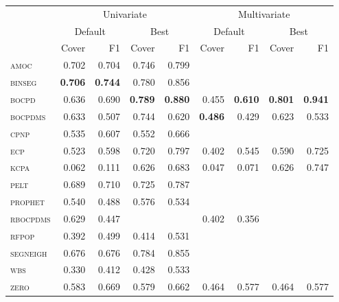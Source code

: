 \begin{tabular}{lrr|rrrr|rr}
 & \multicolumn{4}{c}{Univariate} & \multicolumn{4}{c}{Multivariate} \\\cmidrule(lr){2-5}\cmidrule(lr){6-9}
 & \multicolumn{2}{c}{Default} & \multicolumn{2}{c}{Best} & \multicolumn{2}{c}{Default} & \multicolumn{2}{c}{Best} \\\cmidrule(lr){2-3}\cmidrule(lr){4-5}\cmidrule(lr){6-7}\cmidrule(lr){8-9}
 & Cover & F1 & Cover & F1 & Cover & F1 & Cover & F1\\\cmidrule(r){1-1}\cmidrule(lr){2-5}\cmidrule(l){6-9}
\textsc{amoc}     & 0.702 & 0.704 & 0.746 & 0.799 &       &       &       &       \\
\textsc{binseg}   & \textbf{0.706} & \textbf{0.744} & 0.780 & 0.856 &       &       &       &       \\
\textsc{bocpd}    & 0.636 & 0.690 & \textbf{0.789} & \textbf{0.880} & 0.455 & \textbf{0.610} & \textbf{0.801} & \textbf{0.941} \\
\textsc{bocpdms}  & 0.633 & 0.507 & 0.744 & 0.620 & \textbf{0.486} & 0.429 & 0.623 & 0.533 \\
\textsc{cpnp}     & 0.535 & 0.607 & 0.552 & 0.666 &       &       &       &       \\
\textsc{ecp}      & 0.523 & 0.598 & 0.720 & 0.797 & 0.402 & 0.545 & 0.590 & 0.725 \\
\textsc{kcpa}     & 0.062 & 0.111 & 0.626 & 0.683 & 0.047 & 0.071 & 0.626 & 0.747 \\
\textsc{pelt}     & 0.689 & 0.710 & 0.725 & 0.787 &       &       &       &       \\
\textsc{prophet}  & 0.540 & 0.488 & 0.576 & 0.534 &       &       &       &       \\
\textsc{rbocpdms} & 0.629 & 0.447 &       &       & 0.402 & 0.356 &       &       \\
\textsc{rfpop}    & 0.392 & 0.499 & 0.414 & 0.531 &       &       &       &       \\
\textsc{segneigh} & 0.676 & 0.676 & 0.784 & 0.855 &       &       &       &       \\
\textsc{wbs}      & 0.330 & 0.412 & 0.428 & 0.533 &       &       &       &       \\
\textsc{zero}     & 0.583 & 0.669 & 0.579 & 0.662 & 0.464 & 0.577 & 0.464 & 0.577 \\
\cmidrule(r){1-1}\cmidrule(lr){2-5}\cmidrule(l){6-9}
\end{tabular}
